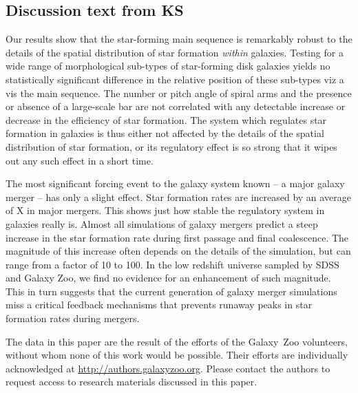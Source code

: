 \documentclass{emulateapj}
\begin{document}
\subsection{Discussion text from KS}
Our results show that the star-forming main sequence is remarkably robust to the details of the spatial distribution of star formation \textit{within} galaxies. Testing for a wide range of morphological sub-types of star-forming disk galaxies yields no statistically significant difference in the relative position of these sub-types viz a vis the main sequence. The number or pitch angle of spiral arms and the presence or absence of a large-scale bar are not correlated with any detectable increase or decrease in the efficiency of star formation. The system which regulates star formation in galaxies is thus either not affected by the details of the spatial distribution of star formation, or its regulatory effect is so strong that it wipes out any such effect in a short time. 

The most significant forcing event to the galaxy system known -- a major galaxy merger -- has only a slight effect. Star formation rates are increased by an average of X in major mergers. This shows just how stable the regulatory system in galaxies really is. Almost all simulations of galaxy mergers predict a steep increase in the star formation rate during first passage and final coalescence. The magnitude of this increase often depends on the details of the simulation, but can range from a factor of 10 to 100. In the low redshift universe sampled by SDSS and Galaxy Zoo, we find no evidence for an enhancement of such magnitude. This in turn suggests that the current generation of galaxy merger simulations miss a critical feedback mechanisms that prevents runaway peaks in star formation rates during mergers.




\acknowledgments

The data in this paper are the result of the efforts of the Galaxy~Zoo volunteers, without whom none of this work would be possible. Their efforts are individually acknowledged at \url{http://authors.galaxyzoo.org}. Please contact the authors to request access to research materials discussed in this paper. 
\end{document}
